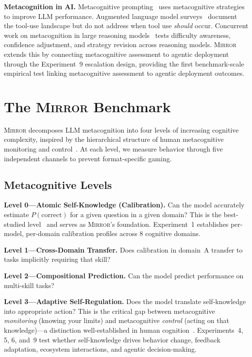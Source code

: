 \documentclass[10pt]{article}
\newcommand{\mirror}{\textsc{Mirror}}
\begin{document}
\textbf{Metacognition in AI.}
Metacognitive prompting~\citep{wang2024metacognitive} uses metacognitive strategies
to improve LLM performance. Augmented language model surveys~\citep{mialon2023augmented}
document the tool-use landscape but do not address when tool use \textit{should}
occur. Concurrent work on metacognition in large reasoning
models~\citep{metacog2026} tests difficulty awareness, confidence adjustment, and
strategy revision across reasoning models. \mirror{} extends this by connecting
metacognitive assessment to agentic deployment through the Experiment~9 escalation
design, providing the first benchmark-scale empirical test linking metacognitive
assessment to agentic deployment outcomes.

\section{The \mirror{} Benchmark}
\label{sec:benchmark}

\mirror{} decomposes LLM metacognition into four levels of increasing cognitive
complexity, inspired by the hierarchical structure of human metacognitive monitoring
and control~\citep{flavell1979metacognition, nelson1990metamemory}. At each level,
we measure behavior through five independent channels to prevent format-specific
gaming.

\subsection{Metacognitive Levels}

\textbf{Level 0---Atomic Self-Knowledge (Calibration).}
Can the model accurately estimate $P(\text{correct})$ for a given question in a
given domain? This is the best-studied level~\citep{kadavath2022language,
kapoor2024calibration} and serves as \mirror{}'s foundation. Experiment~1
establishes per-model, per-domain calibration profiles across 8 cognitive domains.

\textbf{Level 1---Cross-Domain Transfer.}
Does calibration in domain~A transfer to tasks implicitly requiring that skill?

\textbf{Level 2---Compositional Prediction.}
Can the model predict performance on multi-skill tasks?

\textbf{Level 3---Adaptive Self-Regulation.}
Does the model translate self-knowledge into appropriate action? This is the
critical gap between metacognitive \textit{monitoring} (knowing your limits) and
metacognitive \textit{control} (acting on that knowledge)---a distinction
well-established in human cognition~\citep{metcalfe2008metacognitive}.
Experiments~4, 5, 6, and~9 test whether self-knowledge drives behavior change,
feedback adaptation, ecosystem interactions, and agentic decision-making.
\end{document}
